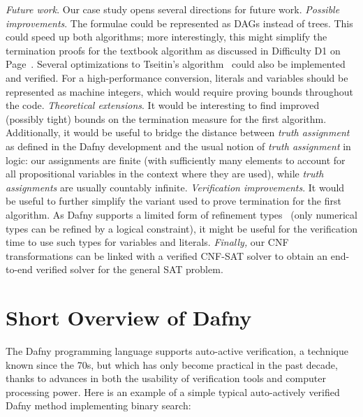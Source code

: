 \documentclass[12pt]{report}
\begin{document}
\emph{Future work}. Our case study opens several directions for future
work.
%
\emph{Possible improvements}. The formulae could be represented as
DAGs instead of trees. This could speed up both algorithms; more
interestingly, this might simplify the termination proofs for the
textbook algorithm as discussed in Difficulty D1 on
Page~\pageref{dif:d1}. Several optimizations to Tseitin's
algorithm~\cite{harrison,DBLP:journals/jsc/Tour92} could also be
implemented and verified. For a high-performance conversion, literals
and variables should be represented as machine integers, which would
require proving bounds throughout the code.
%
\emph{Theoretical extensions}. It would be interesting to find
improved (possibly tight) bounds on the termination measure for the
first algorithm. Additionally, it would be useful to bridge the
distance between \emph{truth assignment} as defined in the Dafny
development and the usual notion of \emph{truth assignment} in logic:
our assignments are finite (with sufficiently many elements to account
for all propositional variables in the context where they are used),
while \emph{truth assignments} are usually countably infinite.
%
\emph{Verification improvements}. It would be useful to further
simplify the variant used to prove termination for the first
algorithm. As Dafny supports a limited form of refinement
types~\cite{dafnyReferenceManual} (only numerical types can be refined
by a logical constraint), it might be useful for the verification time
to use such types for variables and literals.
%
\emph{Finally,} our CNF transformations can be linked with a verified
CNF-SAT solver to obtain an end-to-end verified solver for the general
SAT problem.

\clearpage





\clearpage

\appendix

\section{Short Overview of Dafny}
\label{sec:dafny}

The Dafny programming language supports auto-active verification, a
technique known since the 70s, but which has only become practical in
the past decade, thanks to advances in both the usability of
verification tools and computer processing power. Here is an example
of a simple typical auto-actively verified Dafny method implementing
binary search:
\end{document}
